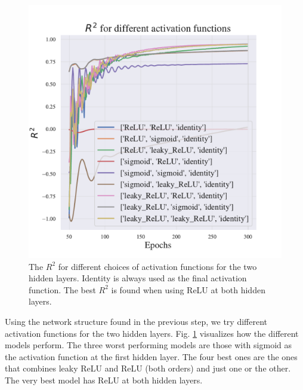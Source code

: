 \begin{figure}[h!]
    \centering
    \includegraphics[width=1.0\linewidth]{project_2/figures/$R^2$ for different activation functions_continuous.pdf}
    \caption{The $R^2$ for different choices of activation functions for the two hidden layers. Identity is always used as the final activation function. The best $R^2$ is found when using ReLU at both hidden layers.}
    \label{fig:activation_franke}
\end{figure}

Using the network structure found in the previous step, we try different activation functions for the two hidden layers. 
Fig. \ref{fig:activation_franke} visualizes how the different models perform. 
The three worst performing models are those with sigmoid as the activation function at the first hidden layer. 
The four best ones are the ones that combines leaky ReLU and ReLU (both orders) and just one or the other. 
The very best model has ReLU at both hidden layers. 

